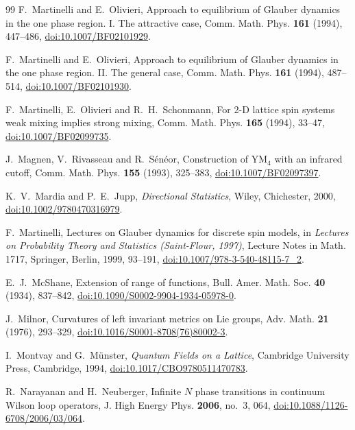 \documentclass[aps,prd,twocolumn,superscriptaddress,nofootinbib,longbibliography,floatfix,amsmath,amssymb,10pt]{revtex4-2}
\theoremstyle{definition}
\theoremstyle{remark}
\begin{document}
\begin{thebibliography}{99}
F.~Martinelli and E.~Olivieri, Approach to equilibrium of Glauber dynamics in
the one phase region. I. The attractive case, Comm. Math. Phys. \textbf{161}
(1994), 447--486,
\href{https://doi.org/10.1007/BF02101929}{doi:10.1007/BF02101929}.

F.~Martinelli and E.~Olivieri, Approach to equilibrium of Glauber dynamics in
the one phase region. II. The general case, Comm. Math. Phys. \textbf{161}
(1994), 487--514,
\href{https://doi.org/10.1007/BF02101930}{doi:10.1007/BF02101930}.

F.~Martinelli, E.~Olivieri and R.~H.~Schonmann, For 2-D lattice spin systems
weak mixing implies strong mixing, Comm. Math. Phys. \textbf{165} (1994),
33--47,
\href{https://doi.org/10.1007/BF02099735}{doi:10.1007/BF02099735}.

J.~Magnen, V.~Rivasseau and R.~S\'en\'eor, Construction of YM$_4$ with an infrared cutoff, Comm. Math. Phys. \textbf{155} (1993), 325--383, \href{https://doi.org/10.1007/BF02097397}{doi:10.1007/BF02097397}.

K.~V.~Mardia and P.~E.~Jupp, \emph{Directional Statistics}, Wiley, Chichester, 2000, \href{https://doi.org/10.1002/9780470316979}{doi:10.1002/9780470316979}.

F.~Martinelli, Lectures on Glauber dynamics for discrete spin models, in
\emph{Lectures on Probability Theory and Statistics (Saint-Flour, 1997)},
Lecture Notes in Math. 1717, Springer, Berlin, 1999, 93--191,
\href{https://doi.org/10.1007/978-3-540-48115-7_2}{doi:10.1007/978-3-540-48115-7\_2}.

E.~J.~McShane, Extension of range of functions, Bull. Amer. Math. Soc. \textbf{40} (1934), 837--842, \href{https://doi.org/10.1090/S0002-9904-1934-05978-0}{doi:10.1090/S0002-9904-1934-05978-0}.

J.~Milnor, Curvatures of left invariant metrics on Lie groups, Adv.
Math. \textbf{21} (1976), 293--329,
\href{https://doi.org/10.1016/S0001-8708(76)80002-3}{doi:10.1016/S0001-8708(76)80002-3}.

I.~Montvay and G.~M\"unster, \emph{Quantum Fields on a Lattice}, Cambridge
University Press, Cambridge, 1994,
\href{https://doi.org/10.1017/CBO9780511470783}{doi:10.1017/CBO9780511470783}.

R.~Narayanan and H.~Neuberger, Infinite $N$ phase transitions in continuum
Wilson loop operators, J. High Energy Phys. \textbf{2006}, no.~3, 064,
\href{https://doi.org/10.1088/1126-6708/2006/03/064}{doi:10.1088/1126-6708/2006/03/064}.


\end{thebibliography}
\end{document}
